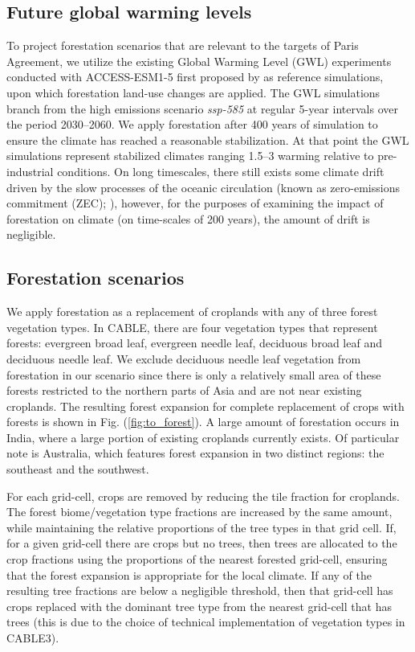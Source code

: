 \documentclass[]{article}
\begin{document}
\subsection{Future global warming levels}

To project forestation scenarios that are relevant to the targets of Paris Agreement, we utilize the existing Global Warming Level (GWL) experiments conducted with ACCESS-ESM1-5 first proposed by \cite{king_studying_2021} as reference simulations, upon which forestation land-use changes are applied. The GWL simulations branch from the high emissions scenario \textit{ssp-585} \parencite{oneill_scenario_2016, jones_c4mip_2016} at regular 5-year intervals over the period 2030–2060. We apply forestation after 400 years of simulation to ensure the climate has reached a reasonable stabilization. At that point the GWL simulations represent stabilized climates ranging 1.5–3 \textcelsius  warming relative to pre-industrial conditions. On long timescales, there still exists some climate drift driven by the slow processes of the oceanic circulation (known as zero-emissions commitment (ZEC); \cite{chamberlain_southern_2023}), however, for the purposes of examining the impact of forestation on climate (on time-scales of 200 years), the amount of drift is negligible.

\subsection{Forestation scenarios}

We apply forestation as a replacement of croplands with any of three forest vegetation types.
In CABLE, there are four vegetation types that represent forests: evergreen broad leaf, evergreen needle leaf, deciduous broad leaf and deciduous needle leaf.
We exclude deciduous needle leaf vegetation from forestation in our scenario since there is only a relatively small area of these forests restricted to the northern parts of Asia and are not near existing croplands.
The resulting forest expansion for complete replacement of crops with forests is shown in Fig. (\ref{fig:to_forest}).
A large amount of forestation occurs in India, where a large portion of existing croplands currently exists.
Of particular note is Australia, which features forest expansion in two distinct regions: the southeast and the southwest.

For each grid-cell, crops are removed by reducing the tile fraction for croplands.
The forest biome/vegetation type fractions are increased by the same amount, while maintaining the relative proportions of the tree types in that grid cell.
If, for a given grid-cell there are crops but no trees, then trees are allocated to the crop fractions using the proportions of the nearest forested grid-cell, ensuring that the forest expansion is appropriate for the local climate.
If any of the resulting tree fractions are below a negligible threshold, then that grid-cell has crops replaced with the dominant tree type from the nearest grid-cell that has trees (this is due to the choice of technical implementation of vegetation types in CABLE3).
\end{document}
